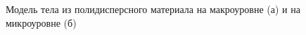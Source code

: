 \begin{figure}[h]
    \begin{minipage}[h]{0.3\linewidth}
    \end{minipage}
    \hfill  
    \begin{minipage}[h]{0.3\linewidth}
    \end{minipage}
    \caption{Модель тела из полидисперсного материала на макроуровне (а) и на микроуровне (б)}
    \label{fig:micmac}
\end{figure}



